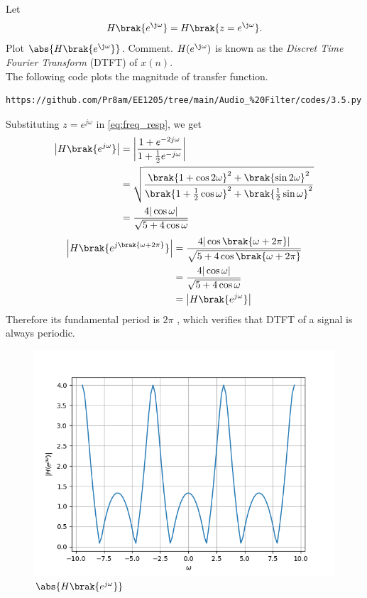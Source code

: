 \documentclass[journal,12pt,twocolumn]{IEEEtran}
\theoremstyle{remark}
\begin{document}
\begin{enumerate}[label=\thesection.\arabic*]
Let
\begin{equation}
H\brak{e^{\j \omega}} = H\brak{z = e^{\j \omega}}.
\end{equation}
Plot $\abs{H\brak{e^{\j \omega}}}$.  Comment.  $H(e^{\j \omega})$ is
known as the {\em Discret Time Fourier Transform} (DTFT) of $x(n)$.
\\
\solution The following code plots the magnitude of transfer function.
\begin{lstlisting}
https://github.com/Pr8am/EE1205/tree/main/Audio_%20Filter/codes/3.5.py
\end{lstlisting}
Substituting $z = e^{j \omega}$ in \eqref{eq:freq_resp}, we get
\begin{align}
	\left|H\brak{e^{j\omega}}\right| &= \left|\frac{1 + e^{-2j\omega}}{1 + \frac{1}{2}e^{-j\omega}}\right| \\
									  &= \sqrt{\frac{\brak{1 + \cos{2\omega}}^2 + \brak{\sin{2\omega}}^2}{\brak{1 + \frac{1}{2}\cos{\omega}}^2 + \brak{\frac{1}{2}\sin{\omega}}^2}}\\
									  &= \frac{4|\cos{\omega}|}{\sqrt{5 + 4\cos{\omega}}}
\end{align}
\begin{align}
	\left|H\brak{e^{j\brak{\omega + 2\pi}}}\right| &= \frac{4|\cos\brak{\omega + 2\pi}|}{\sqrt{5 + 4\cos\brak{\omega + 2\pi}}} \\
											   &= \frac{4|\cos{\omega}|}{\sqrt{5 + 4\cos{\omega}}} \\
											   &= \left|H\brak{e^{j\omega}}\right|	
\end{align}
Therefore its fundamental period is $2\pi$ , which verifies that DTFT of a signal is always periodic.

\begin{figure}[H]
\centering
\includegraphics[width=\columnwidth]{figs/H(z)_3.5.png}
\caption{$\abs{H\brak{e^{j\omega}}}$}
\label{fig:H(z)_3.5}
\end{figure}
\end{enumerate}
\end{document}
